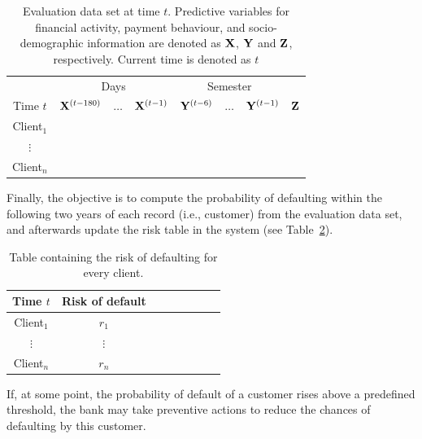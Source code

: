 \begin{itemize}
\begin{table}[htbp]
\centering
\begin{tabular}{c|ccc|ccc|c}
	&\multicolumn{3}{c|}{Days} & \multicolumn{3}{c|}{Semester} \\
     Time $t$              & $\mathbf{X}^{(t-180)}$ & $\ldots$ & $\mathbf{X}^{(t-1)} $ & $\mathbf{Y}^{(t-6)}$  & $\ldots$ & $\mathbf{Y}^{(t-1)} $ & $\mathbf{Z}$  \\  
\hline
Client$_1$  &                                                  &              &                     &                               &                     &        \\ 
$\vdots$      &                                                 &               &                     &                                &                     &      \\ 
Client$_n$  &                                                &               &                     &                                &                     &     \\ 
\end{tabular}
\caption{Evaluation data set at time $t$. Predictive variables for financial activity, payment behaviour, and socio-demographic information are denoted as $\mathbf{X}$, $\mathbf{Y}$ and $\mathbf{Z}$, respectively. Current time is denoted as $t$}
\label{tab:EvaluationDataset} 
\end{table}

Finally, the objective is to compute the probability of defaulting within the following two years of each record (i.e., customer) from the evaluation data set, and afterwards update the risk table in the system (see Table~\ref{tab:riskTable}).

\begin{table}[h]
\centering
\begin{tabular}{c|ccc|ccc|c}
     Time $t$  & Risk of default \\  
\hline
Client$_1$  &    $r_1$  \\ 
$\vdots$      &   $\vdots$   \\ 
Client$_n$  &   $r_n$  \\ 
\end{tabular} 
\caption{Table containing the risk of defaulting for every client.}
\label{tab:riskTable}
\end{table}

If, at some point, the probability of default of a customer rises above a predefined threshold, the bank may take preventive actions to reduce the chances of defaulting by this customer.



\end{itemize}
